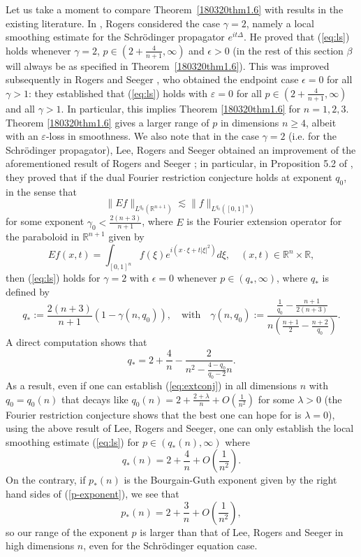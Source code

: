 \documentclass[12pt,leqno]{amsart}
\def\R{\mathbb{R}}
\theoremstyle{plain}
\numberwithin{equation}{section}
\begin{document}
Let us take a moment to compare Theorem~\ref{180320thm1.6} with results in the existing literature. In \cite{Rog08}, Rogers considered the case $\gamma = 2$, namely a local smoothing estimate for the Schr\"{o}dinger propagator $e^{it\Delta}$. He proved that (\ref{eq:ls}) holds whenever $\gamma = 2$, $p \in (2+\frac{4}{n+1},\infty)$ and $\epsilon > 0$ (in the rest of this section $\beta$ will always be as specified in Theorem~\ref{180320thm1.6}). This was improved subsequently in Rogers and Seeger \cite{MR2629687}, who obtained the endpoint case $\epsilon = 0$ for all $\gamma > 1$: they established that (\ref{eq:ls}) holds with $\varepsilon = 0$ for all $p \in (2+\frac{4}{n+1},\infty)$ and all $\gamma > 1$. In particular, this implies Theorem \ref{180320thm1.6} for $n=1,2,3$. Theorem \ref{180320thm1.6} gives a larger range of $p$ in dimensions $n\ge 4$, albeit with an $\varepsilon$-loss in smoothness. We also note that in the case $\gamma = 2$ (i.e. for the Schr\"{o}dinger propagator), Lee, Rogers and Seeger \cite{LRS13} obtained an improvement of the aforementioned result of Rogers and Seeger \cite{MR2629687}; in particular, in Proposition 5.2 of \cite{LRS13}, they proved that if the dual Fourier restriction conjecture holds at exponent $q_0$, in the sense that $$\|Ef\|_{L^{q_0}(\R^{n+1})} \lesssim \|f\|_{L^{q_0}([0,1]^n)}$$ for some exponent $\gamma_0 < \frac{2(n+3)}{n+1}$, where $E$ is the Fourier extension operator for the paraboloid in $\R^{n+1}$ given by
\begin{equation} \label{eq:extconj}
Ef(x,t) = \int_{[0,1]^n} f(\xi) e^{i (x \cdot \xi + t |\xi|^2)} d\xi, \quad (x,t) \in \R^n \times \R,
\end{equation}
then (\ref{eq:ls}) holds for $\gamma = 2$ with $\epsilon = 0$ whenever $p \in (q_*,\infty)$, where $q_*$ is defined by
$$
q_* := \frac{2(n+3)}{n+1} \left(1- \gamma(n,q_0) \right), \quad \text{with} \quad \gamma(n,q_0) := \frac{ \frac{1}{q_0} - \frac{n+1}{2(n+3)} }{ n \left( \frac{n+1}{2} - \frac{n+2}{q_0} \right) }.
$$
A direct computation shows that
$$
q_* = 2 + \frac{4}{n} - \frac{2}{n^2 - \frac{4-q_0}{q_0-2} n}.
$$
As a result, even if one can establish (\ref{eq:extconj}) in all dimensions $n$ with $q_0 = q_0(n)$ that decays like $q_0(n) = 2 + \frac{2+\lambda}{n} + O(\frac{1}{n^2})$ for some $\lambda > 0$ (the Fourier restriction conjecture shows that the best one can hope for is $\lambda = 0$), using the above result of Lee, Rogers and Seeger, one can only establish the local smoothing estimate (\ref{eq:ls}) for $p \in (q_*(n),\infty)$ where $$q_*(n) = 2 + \frac{4}{n} + O\left(\frac{1}{n^2}\right).$$ On the contrary, if $p_*(n)$ is the Bourgain-Guth exponent given by the right hand sides of (\ref{p-exponent}), we see that 
$$
p_*(n) = 2 + \frac{3}{n} + O\left(\frac{1}{n^2} \right),
$$
so our range of the exponent $p$ is larger than that of Lee, Rogers and Seeger in high dimensions $n$, even for the Schr\"{o}dinger equation case.
\end{document}
